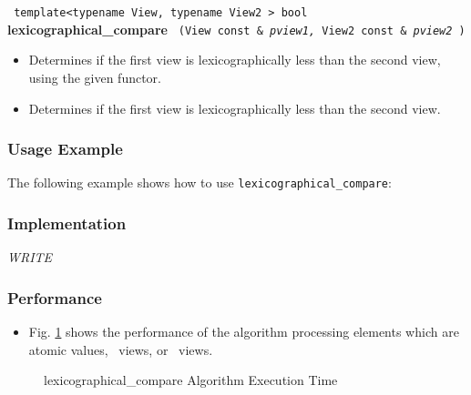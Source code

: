 \noindent
\texttt{%
template<typename View, typename View2 >
\newline
bool 
}
\newline
\textbf{lexicographical\_compare}%
\texttt{%
(View const \&
\textit{pview1,}%
View2 const \&
\textit{pview2}%
)
}

\begin{itemize}
\item
Determines if the first view is lexicographically less than the second view, using the given functor. 
\item
Determines if the first view is lexicographically less than the second view. 
\end{itemize}

\subsubsection{Usage Example} %

The following example shows how to use \texttt{lexicographical\_compare}:

 
\subsubsection{Implementation} %

\textit{WRITE}

\subsubsection{Performance} %

\begin{itemize}
\item
Fig. \ref{fig:lex-comp-alg-exec-exper}
shows the performance of the algorithm processing
elements which are atomic values, \stl\ views, or \stapl\ views.
\end{itemize}

\begin{figure}[p]
\caption{lexicographical\_compare Algorithm Execution Time}
\label{fig:lex-comp-alg-exec-exper}
\end{figure}

